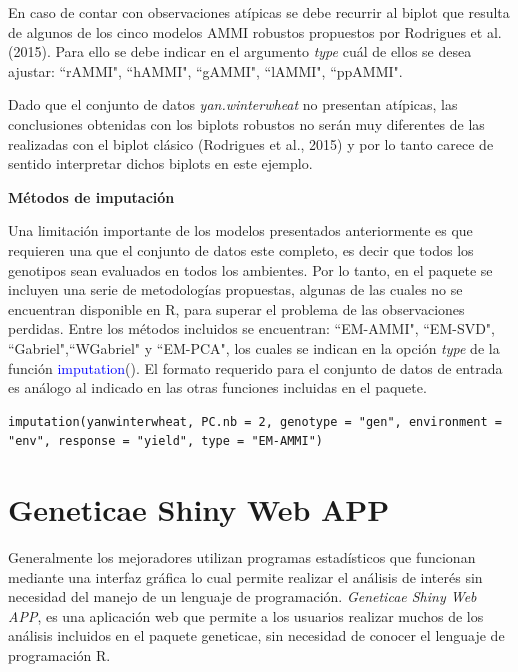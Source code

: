 En caso de contar con observaciones atípicas se debe recurrir al biplot que resulta de algunos de los cinco modelos AMMI robustos propuestos por Rodrigues et al. (2015). Para ello se debe indicar en el argumento \emph{type} cuál de ellos se desea ajustar: ``rAMMI", ``hAMMI", ``gAMMI", ``lAMMI", ``ppAMMI".

Dado que el conjunto de datos \emph{yan.winterwheat} no presentan atípicas, las conclusiones obtenidas con los biplots robustos no serán muy diferentes de las realizadas con el biplot clásico (Rodrigues et al., 2015) y por lo tanto carece de sentido interpretar dichos biplots en este ejemplo. 



\textbf{Métodos de imputación}

Una limitación importante de los modelos presentados anteriormente es que requieren una que el conjunto de datos este completo, es decir que todos los genotipos sean evaluados en todos los ambientes. Por lo tanto, en el paquete se incluyen una serie de metodologías propuestas, algunas de las cuales no se encuentran disponible en R, para superar el problema de las observaciones perdidas. Entre los métodos incluidos se encuentran: ``EM-AMMI", ``EM-SVD", ``Gabriel",``WGabriel" y ``EM-PCA", los cuales se indican en la opción \emph{type} de la función \textcolor{blue}{imputation}(). El formato requerido para el conjunto de datos de entrada es análogo al indicado en las otras funciones incluidas en el paquete.

\begin{tcolorbox}[skin=bicolor,
    colframe=aurometalsaurus,colback=backcolour,colbacklower=white,
    width=1\linewidth,
    height=0.1\linewidth,
    boxsep=-3mm]
\begin{lstlisting}
imputation(yanwinterwheat, PC.nb = 2, genotype = "gen", environment = "env", response = "yield", type = "EM-AMMI")
\end{lstlisting}
\end{tcolorbox}
\section{Geneticae Shiny Web APP}

Generalmente los mejoradores utilizan programas estadísticos que funcionan mediante una interfaz gráfica lo cual permite realizar el análisis de interés sin necesidad del manejo de un lenguaje de programación. \emph{Geneticae Shiny Web APP}, es una aplicación web que permite a los usuarios realizar muchos de los análisis incluidos en el paquete geneticae, sin necesidad de conocer el lenguaje de programación R. 

